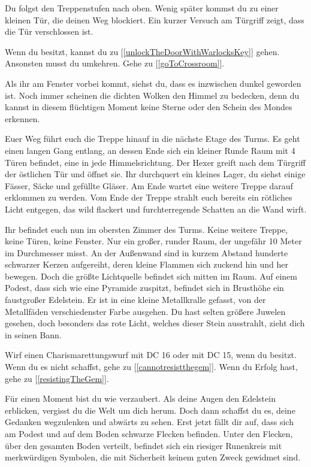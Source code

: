 Du folgst den Treppenstufen nach oben. Wenig später kommst du zu einer kleinen Tür, die deinen Weg blockiert. Ein kurzer Versuch am Türgriff zeigt, dass die Tür verschlossen ist.

Wenn du  besitzt, kannst du zu [\ref{unlockTheDoorWithWarlocksKey}] gehen. Ansonsten musst du umkehren. Gehe zu [\ref{goToCrossroom}].


Als ihr am Fenster vorbei kommt, siehst du, dass es inzwischen dunkel geworden ist. Noch immer scheinen die dichten Wolken den Himmel zu bedecken, denn du kannst in diesem flüchtigen Moment keine Sterne oder den Schein des Mondes erkennen.

Euer Weg führt euch die Treppe hinauf in die nächste Etage des Turms. Es geht einen langen Gang entlang, an dessen Ende sich ein kleiner Runde Raum mit 4 Türen befindet, eine in jede Himmelsrichtung. Der Hexer greift nach dem Türgriff der östlichen Tür und öffnet sie. Ihr durchquert ein kleines Lager, du siehst einige Fässer, Säcke und gefüllte Gläser. Am Ende wartet eine weitere Treppe darauf erklommen zu werden. Vom Ende der Treppe strahlt euch bereits ein rötliches Licht entgegen, das wild flackert und furchterregende Schatten an die Wand wirft.

Ihr befindet euch nun im obersten Zimmer des Turms. Keine weitere Treppe, keine Türen, keine Fenster. Nur ein großer, runder Raum, der ungefähr 10 Meter im Durchmesser misst. An der Außenwand sind in kurzem Abstand hunderte schwarzer Kerzen aufgereiht, deren kleine Flammen sich zuckend hin und her bewegen.
Doch die größte Lichtquelle befindet sich mitten im Raum. Auf einem Podest, dass sich wie eine Pyramide zuspitzt, befindet sich in Brusthöhe ein faustgroßer Edelstein. Er ist in eine kleine Metallkralle gefasst, von der Metallfäden verschiedenster Farbe ausgehen. Du hast selten größere Juwelen gesehen, doch besonders das rote Licht, welches dieser Stein ausstrahlt, zieht dich in seinen Bann.

Wirf einen Charismarettungswurf mit DC 16 oder mit DC 15, wenn du  besitzt. Wenn du es nicht schaffst, gehe zu [\ref{cannotresistthegem}]. Wenn du Erfolg hast, gehe zu [\ref{resistingTheGem}].


Für einen Moment bist du wie verzaubert. Als deine Augen den Edelstein erblicken, vergisst du die Welt um dich herum. Doch dann schaffst du es, deine Gedanken wegzulenken und abwärts zu sehen. Erst jetzt fällt dir auf, dass sich am Podest und auf dem Boden schwarze Flecken befinden. Unter den Flecken, über den gesamten Boden verteilt, befindet sich ein riesiger Runenkreis mit merkwürdigen Symbolen, die mit Sicherheit keinem guten Zweck gewidmet sind.

